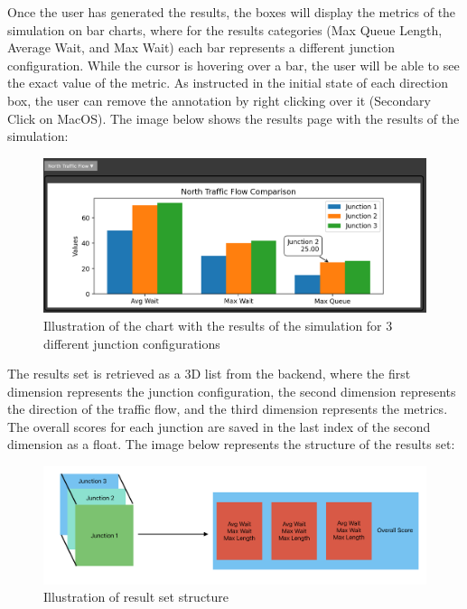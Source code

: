 \documentclass{article}
\begin{document}
    Once the user has generated the results, the boxes will display the metrics of the simulation on bar charts, where for the results categories (Max Queue Length, Average Wait, and Max Wait)
    each bar represents a different junction configuration. While the cursor is hovering over a bar, the user will be able to see the exact value of the metric. As instructed in the initial state
    of each direction box, the user can remove the annotation by right clicking over it (Secondary Click on MacOS). The image below shows the results page with the results of the simulation:

    \begin{figure}[H]
        \centering
        \includegraphics[width=\textwidth]{results2}
        \caption{Illustration of the chart with the results of the simulation for 3 different junction configurations}
        \label{fig:results2}
    \end{figure}

    The results set is retrieved as a 3D list from the backend, where the first dimension represents the junction configuration, the second dimension represents the direction of the traffic flow, and the third dimension represents the metrics. The overall scores
    for each junction are saved in the last index of the second dimension as a float.
    The image below represents the structure of the results set:

    \begin{figure}[H]
        \centering
        \includegraphics[width=\textwidth]{results3d}
        \caption{Illustration of result set structure}
        \label{fig:results3d}
    \end{figure}
\end{document}
